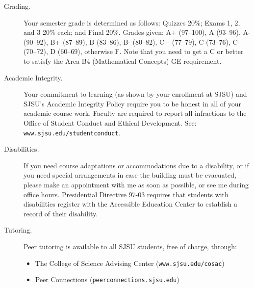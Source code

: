 \documentclass[letterpaper, 12pt]{article}
\begin{document}
\begin{description}
\item[Grading.]  Your semester grade is determined as follows: Quizzes 20\%;
  Exams 1, 2, and 3 20\% each; and Final 20\%.  Grades given: A+ (97--100),
  A (93--96), A- (90--92), B+ (87--89), B (83--86), B- (80--82), C+ (77--79),
  C (73--76), C- (70--72), D (60--69), otherwise F.  Note that you need to get
  a C or better to satisfy the Area B4 (Mathematical Concepts) GE requirement.

\item[Academic Integrity.] Your commitment to learning (as shown by your
  enrollment at SJSU) and SJSU's Academic Integrity Policy require you to be
  honest in all of your academic course work.  Faculty are required to report
  all infractions to the Office of Student Conduct and Ethical Development.
  See: \texttt{www.sjsu.edu/studentconduct}.

\item[Disabilities.] If you need course adaptations or accommodations due to a
  disability, or if you need special arrangements in case the building must be
  evacuated, please make an appointment with me as soon as possible, or see me
  during office hours.  Presidential Directive 97-03 requires that students
  with disabilities register with the Accessible Education Center to establish
  a record of their disability.

\item[Tutoring.] Peer tutoring is available to all SJSU students, free of
  charge, through:
  \begin{itemize}
  \item The College of Science Advising Center (\texttt{www.sjsu.edu/cosac})
  \item Peer Connections (\texttt{peerconnections.sjsu.edu})
  \end{itemize}

\end{description}
\end{document}
